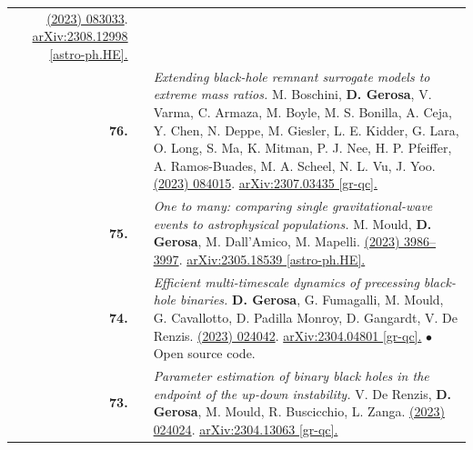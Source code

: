 {\begin{longtable}{rp{0.3cm}p{15.8cm}}
\href{https://journals.aps.org/prd/abstract/10.1103/PhysRevD.108.083033}{\prd 108 (2023) 083033}. \href{https://arxiv.org/abs/2308.12998}{arXiv:2308.12998 [astro-ph.HE].}
\vspace{0.09cm}\\
%
\textbf{76.} & & \textit{Extending black-hole remnant surrogate models to extreme mass ratios.}
\newline{}
M. Boschini, \textbf{D. Gerosa}, V. Varma, C. Armaza, M. Boyle, M. S. Bonilla, A. Ceja, Y. Chen, N. Deppe, M. Giesler, L. E. Kidder, G. Lara, O. Long, S. Ma, K. Mitman, P. J. Nee, H. P. Pfeiffer, A. Ramos-Buades, M. A. Scheel, N. L. Vu, J. Yoo.
\newline{}
\href{https://journals.aps.org/prd/abstract/10.1103/PhysRevD.108.084015}{\prd 108 (2023) 084015}. \href{https://arxiv.org/abs/2307.03435}{arXiv:2307.03435 [gr-qc].}
\vspace{0.09cm}\\
%
\textbf{75.} & & \textit{One to many: comparing single gravitational-wave events to astrophysical populations.}
\newline{}
M. Mould, \textbf{D. Gerosa}, M. Dall'Amico, M. Mapelli.
\newline{}
\href{https://doi.org/10.1093/mnras/stad2502}{\mnras 525 (2023) 3986–3997}. \href{https://arxiv.org/abs/2305.18539}{arXiv:2305.18539 [astro-ph.HE].}
\vspace{0.09cm}\\
%
\textbf{74.} & & \textit{Efficient multi-timescale dynamics of precessing black-hole binaries.}
\newline{}
\textbf{D. Gerosa}, G. Fumagalli, M. Mould, G. Cavallotto, D. Padilla Monroy, D. Gangardt, V. De Renzis.
\newline{}
\href{https://journals.aps.org/prd/abstract/10.1103/PhysRevD.108.024042}{\prd 108 (2023) 024042}. \href{https://arxiv.org/abs/2304.04801}{arXiv:2304.04801 [gr-qc].}
\newline{}
\textcolor{color1}{$\bullet$} Open source code.
\vspace{0.09cm}\\
%
\textbf{73.} & & \textit{Parameter estimation of binary black holes in the endpoint of the up-down instability.}
\newline{}
V. De Renzis, \textbf{D. Gerosa}, M. Mould, R. Buscicchio, L. Zanga.
\newline{}
\href{https://journals.aps.org/prd/abstract/10.1103/PhysRevD.108.024024}{\prd 108 (2023) 024024}. \href{https://arxiv.org/abs/2304.13063}{arXiv:2304.13063 [gr-qc].}

\end{longtable}}
